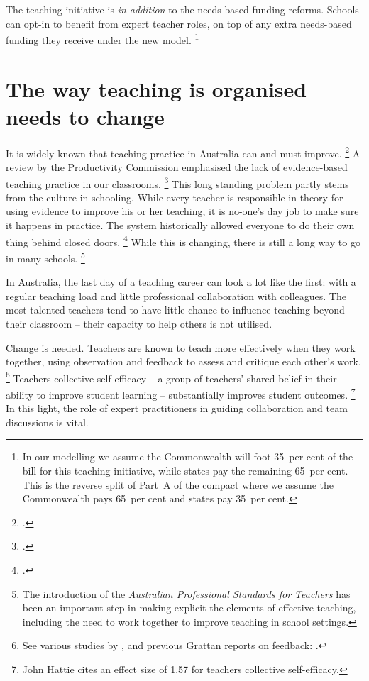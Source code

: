 \documentclass{grattan}
\begin{document}
The teaching initiative is \emph{in addition} to the needs-based funding reforms.
Schools can opt-in to benefit from expert teacher roles, on top of any extra needs-based funding they receive under the new model.%
\footnote{In our modelling we assume the Commonwealth will foot 35~per cent of the bill for this teaching initiative, while states pay the remaining 65~per cent. This is the reverse split of Part~A of the compact where we assume the Commonwealth pays 65~per cent and states pay 35~per cent.}

\section{The way teaching is organised needs to change}\label{sec:the-way-teaching-is-organised-needs-to-change} 

It is widely known that teaching practice in Australia can and must improve.%
\footcites{Goss2015TargetedTeachingHow}{Jensen2010WhatTeachersWant}{Jensen2011BetterTeacherAppraisal}{Santiago2011OECDReviewsEvaluation}
A \citeyear{Commission2016NationalEducationEvidence} review by the Productivity Commission emphasised the lack of evidence-based teaching practice in our classrooms. \footcite{Commission2016NationalEducationEvidence} This long standing problem partly stems from the culture in schooling.
While every teacher is responsible in theory for using evidence to improve his or her teaching, it is no-one's day job to make sure it happens in practice.
The system historically allowed everyone to do their own thing behind closed doors.%
\footcite{Dinham2008TeachingTalentBest}
While this is changing, there is still a long way to go in many schools.%
\footnote{The introduction of the \emph{Australian Professional Standards for Teachers} has been an important step in making explicit the elements of effective teaching, including the need to work together to improve teaching in school settings.}

In Australia, the last day of a teaching career can look a lot like the first: with a regular teaching load and little professional collaboration with colleagues. The most talented teachers tend to have little chance to influence teaching beyond their classroom -- their capacity to help others is not utilised.

Change is needed. Teachers are known to teach more effectively when they work together, using observation and feedback to assess and critique each other's work.%
\footnote{See various studies by \textcites{Timperley2007TeacherProfessionalLearning}{Yoon2007ReviewingEvidenceTeacher}{Blank2009EffectsTeacherProfessional}{Desimone2009ImprovingImpactStudies}{Veen2012WhatMakesTeacher}, and previous Grattan reports on feedback: \textcites{Goss2015TargetedTeachingHow}{Jensen2011BetterTeacherAppraisal}.}
Teachers collective self-efficacy -- a group of teachers' shared belief in their ability to improve student learning -- substantially improves student outcomes.%
\footnote{\textcite{Hattie2009VisibleLearningArticle} John Hattie cites an effect size of 1.57 for teachers collective self-efficacy.}
In this light, the role of expert practitioners in guiding collaboration and team discussions is vital.
\end{document}
